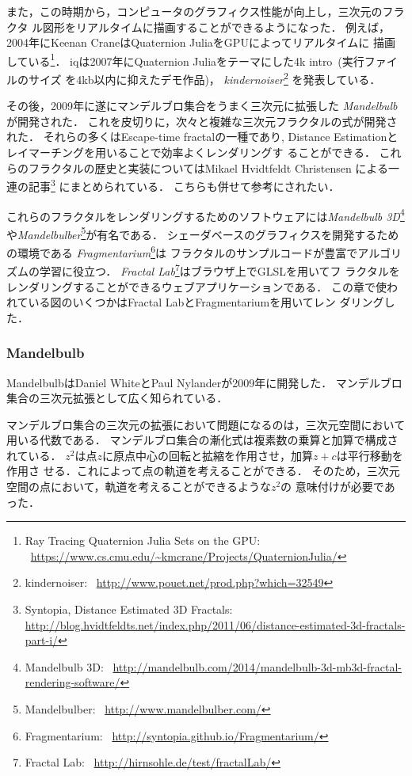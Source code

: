 また，この時期から，コンピュータのグラフィクス性能が向上し，三次元のフラクタ
ル図形をリアルタイムに描画することができるようになった．
例えば，2004年にKeenan CraneはQuaternion JuliaをGPUによってリアルタイムに
描画している\footnote{Ray Tracing Quaternion Julia Sets on
the GPU:
~\url{https://www.cs.cmu.edu/~kmcrane/Projects/QuaternionJulia/}}．
iqは2007年にQuaternion Juliaをテーマにした4k intro~(実行ファイルのサイズ
を4kb以内に抑えたデモ作品)，
\textit{kindernoiser}\footnote{kindernoiser:
~\url{http://www.pouet.net/prod.php?which=32549}}
を発表している．

その後，2009年に遂にマンデルブロ集合をうまく三次元に拡張した
\textit{Mandelbulb}が開発された．
これを皮切りに，次々と複雑な三次元フラクタルの式が開発された．
それらの多くはEscape-time fractalの一種であり,
Distance Estimationとレイマーチングを用いることで効率よくレンダリングす
ることができる．
これらのフラクタルの歴史と実装についてはMikael Hvidtfeldt Christensen
による一連の記事\footnote{Syntopia, Distance Estimated 3D Fractals:\\
\url{http://blog.hvidtfeldts.net/index.php/2011/06/distance-estimated-3d-fractals-part-i/}}
にまとめられている．
こちらも併せて参考にされたい．

これらのフラクタルをレンダリングするためのソフトウェアには\textit{Mandelbulb
3D}\footnote{Mandelbulb 3D:
~\url{http://mandelbulb.com/2014/mandelbulb-3d-mb3d-fractal-rendering-software/}}
や\textit{Mandelbulber}\footnote{Mandelbulber:
~\url{http://www.mandelbulber.com/}}が有名である．
シェーダベースのグラフィクスを開発するための環境である
\textit{Fragmentarium}\footnote{Fragmentarium:
~\url{http://syntopia.github.io/Fragmentarium/}}は
フラクタルのサンプルコードが豊富でアルゴリズムの学習に役立つ．
\textit{Fractal Lab}\footnote{Fractal Lab:
~\url{http://hirnsohle.de/test/fractalLab/}}はブラウザ上でGLSLを用いてフ
ラクタルをレンダリングすることができるウェブアプリケーションである．
この章で使われている図のいくつかはFractal LabとFragmentariumを用いてレン
ダリングした．

\subsubsection{Mandelbulb}

MandelbulbはDaniel WhiteとPaul Nylanderが2009年に開発した．
マンデルブロ集合の三次元拡張として広く知られている．

マンデルブロ集合の三次元の拡張において問題になるのは，三次元空間において
用いる代数である．
マンデルブロ集合の漸化式は複素数の乗算と加算で構成されている．
$z^2$は点$z$に原点中心の回転と拡縮を作用させ，加算$z + c$は平行移動を作用さ
せる．これによって点の軌道を考えることができる．
そのため，三次元空間の点において，軌道を考えることができるような$z^2$の
意味付けが必要であった．

